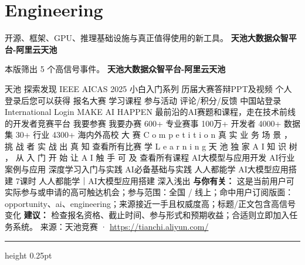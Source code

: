 \documentclass[10.5pt]{ctexart}
\begin{document}
\section*{Engineering}
{\color{ormuted} 开源、框架、GPU、推理基础设施与真正值得使用的新工具。}
\vspace{2mm}
{\LARGE\bfseries 天池大数据众智平台-阿里云天池}\par
\vspace{1mm}
{\color{ormuted} 本版筛出 5 个高信号事件。}
\vspace{3mm}
{\Large\bfseries 天池大数据众智平台-阿里云天池}\par
天池 探索发现 IEEE AICAS 2025 小白入门系列 历届大赛答辩PPT及视频 个人 登录后您可以获得 报名大赛 学习课程 参与活动 评论/积分/反馈 中国站登录 International Login MAKE AI HAPPEN 最前沿的AI赛题和课程，走在技术前线的开发者竞赛平台 我要参赛 我要办赛 600+ 专业赛事 100万+ 开发者 4000+ 数据集 30+ 行业 4300+ 海内外高校 大 赛 C o m p e t i t i o n 真 实 业 务 场 景 ， 挑 战 者 实 战 出 真 知 查看所有比赛 学 L e a r n i n g 天 池 独 家 A I 知 识 树 ， 从 入 门 开 始 让 A I 触 手 可 及 查看所有课程 AI大模型与应用开发 AI行业案例与应用 深度学习入门与实践 AI必备基础与实践 人人都能学 AI大模型应用搭建 7课时 人人都能学｜AI大模型应用搭建 深入浅出
\textbf{与你有关：} 这是当前用户可实际参与或申请的高可触达机会；参与范围：全国 / 线上；命中用户订阅版面：opportunity、ai、engineering；来源接近一手且权威度高；标题/正文包含高信号变化
\textbf{建议：} 检查报名资格、截止时间、参与形式和预期收益；合适则立即加入任务系统。
{\footnotesize\color{ormuted} 来源：天池竞赛 · \url{https://tianchi.aliyun.com/}}
\vspace{4mm}
\hrule height 0.25pt
\vspace{3mm}
\end{document}
